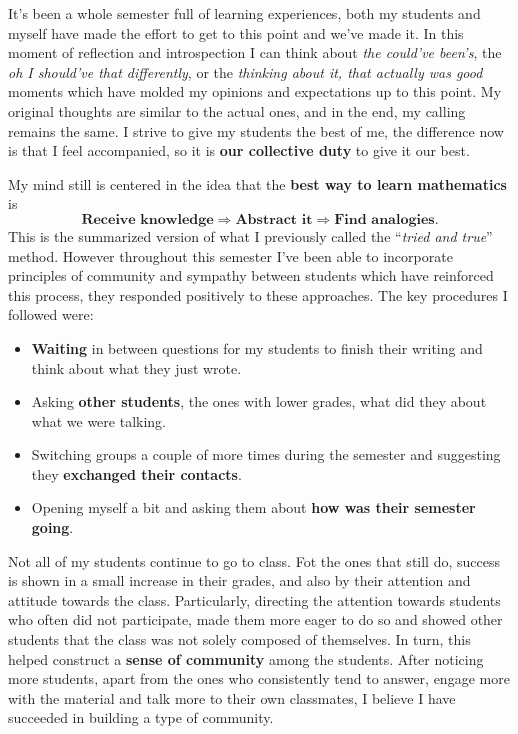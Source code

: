 \documentclass[a4paper,12pt,final]{book}
\begin{document}
It's been a whole semester full of learning experiences, both my students and myself have made the effort to get to this point and we've made it. In this moment of reflection and introspection I can think about \emph{the could've been's}, the \emph{oh I should've that differently}, or the \emph{thinking about it, that actually was good} moments which have molded my opinions and expectations up to this point. My original thoughts are similar to the actual ones, and in the end, my calling remains the same. I strive to give my students the best of me, the difference now is that I feel accompanied, so it is \textbf{our collective duty} to give it our best.\par 
My mind still is centered in the idea that the \textbf{best way to learn mathematics }is 
$$\textbf{Receive knowledge}\Rightarrow\textbf{Abstract it}\Rightarrow\textbf{Find analogies}.$$
This is the summarized version of what I previously called the ``\emph{tried and true}'' method. However throughout this semester I've been able to incorporate principles of community and sympathy between students which have reinforced this process, they responded positively to these approaches. The key procedures I followed were:
\begin{itemize}
    \itemsep=-0.5em
    \item \textbf{Waiting} in between questions for my students to finish their writing and think about what they just wrote. 
    \item Asking \textbf{other students}, the ones with lower grades, what did they about what we were talking. 
    \item Switching groups a couple of more times during the semester and suggesting they \textbf{exchanged their contacts}. 
    \item Opening myself a bit and asking them about \textbf{how was their semester going}. 
\end{itemize}
Not all of my students continue to go to class. 
Fot the ones that still do, success is shown in a small increase in their grades, and also by their attention and attitude towards the class. 
Particularly, directing the attention towards students who often did not participate, made them more eager to do so and showed other students that the class was not solely composed of themselves. 
In turn, this helped construct a \textbf{sense of community} among the students. After noticing more students, apart from the ones who consistently tend to answer, engage more with the material and talk more to their own classmates, I believe I have succeeded in building a type of community.\par 
\end{document}
